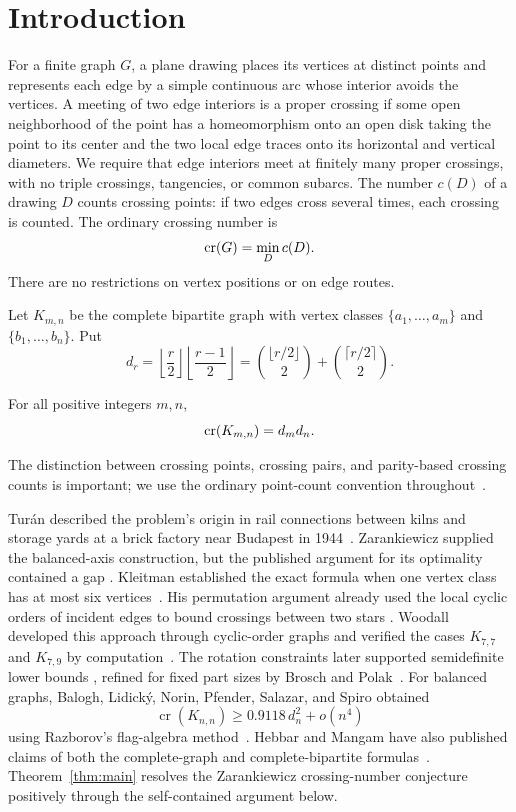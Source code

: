 \section{Introduction}
\label{sec:introduction}

For a finite graph $G$, a plane drawing places its vertices at distinct
points and represents each edge by a simple continuous arc whose interior
avoids the vertices. A meeting of two edge interiors is a proper crossing
if some open neighborhood of the point has a homeomorphism onto an open
disk taking the point to its center and the two local edge traces onto its
horizontal and vertical diameters. We require that edge interiors meet at
finitely many proper crossings, with no triple crossings, tangencies, or
common subarcs.
The number $c(D)$ of a drawing $D$ counts crossing points: if two edges
cross several times, each crossing is counted.
The ordinary crossing number is
\[
  \operatorname{cr}(G)=\min_D c(D).
\]
There are no restrictions on vertex positions or on edge routes.

Let $K_{m,n}$ be the complete bipartite graph with vertex classes
$\{a_1,\ldots,a_m\}$ and $\{b_1,\ldots,b_n\}$. Put
\begin{equation}
\label{eq:dr}
 d_r=\left\lfloor\frac r2\right\rfloor
     \left\lfloor\frac{r-1}{2}\right\rfloor
 =\binom{\lfloor r/2\rfloor}{2}
  +\binom{\lceil r/2\rceil}{2}.
\end{equation}
\begin{theorem}
\label{thm:main}
For all positive integers $m,n$,
\[
 \operatorname{cr}(K_{m,n})=d_m d_n.
\]
\end{theorem}

The distinction between crossing points, crossing pairs, and parity-based
crossing counts is important; we use the ordinary point-count convention
throughout~\cite{PachToth2000,FulekEtAl2012}.

Tur\'an described the problem's origin in rail connections between kilns
and storage yards at a brick factory near Budapest in
1944~\cite[pp.~8--9]{Turan1977}.
Zarankiewicz supplied the balanced-axis construction, but the published
argument for its optimality contained a gap
\cite{Zarankiewicz1955,Turan1977,ErdosGuy1973}.
Kleitman established the exact formula when one vertex class has at
most six vertices~\cite{Kleitman1970}.
His permutation argument already used the local cyclic orders of incident
edges to bound crossings between two stars
\cite[Section~8, equation~(17)]{Kleitman1970}.
Woodall developed this approach through cyclic-order graphs and verified the cases
$K_{7,7}$ and $K_{7,9}$ by computation~\cite{Woodall1993}.
The rotation constraints later supported semidefinite lower bounds
\cite{deKlerkEtAl2006,deKlerkPasechnikSchrijver2007}, refined for fixed
part sizes by Brosch and Polak~\cite{BroschPolak2024}.
For balanced graphs, Balogh, Lidick\'y, Norin, Pfender, Salazar, and
Spiro obtained
\[
 \operatorname{cr}(K_{n,n})\ge0.9118\,d_n^2+o(n^4)
\]
using Razborov's flag-algebra method~\cite{Razborov2007,BaloghEtAl2023}.
Hebbar and Mangam have also published claims of both the complete-graph
and complete-bipartite formulas~\cite{HebbarMangam2018}.
Theorem~\ref{thm:main} resolves the Zarankiewicz crossing-number
conjecture positively through the self-contained argument below.


